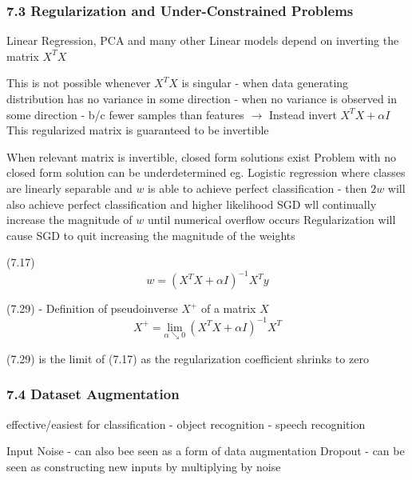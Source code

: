 \documentclass[11pt]{article}
\begin{document}
    \hypertarget{regularization-and-under-constrained-problems}{%
\subsubsection{7.3 Regularization and Under-Constrained
Problems}\label{regularization-and-under-constrained-problems}}

    Linear Regression, PCA and many other Linear models depend on inverting
the matrix \(X^{T}X\)

    This is not possible whenever \(X^{T}X\) is singular - when data
generating distribution has no variance in some direction - when no
variance is observed in some direction - b/c fewer samples than features
\(\rightarrow\) Instead invert \(X^{T}X + \alpha I\) This regularized
matrix is guaranteed to be invertible

    When relevant matrix is invertible, closed form solutions exist Problem
with no closed form solution can be underdetermined eg. Logistic
regression where classes are linearly separable and \(w\) is able to
achieve perfect classification - then \(2w\) will also achieve perfect
classification and higher likelihood SGD wll continually increase the
magnitude of \(w\) until numerical overflow occurs Regularization will
cause SGD to quit increasing the magnitude of the weights

    (7.17) \begin{equation*}
w = (X^{T} X + \alpha I)^{-1} X^{T} y
\end{equation*}

    (7.29) - Definition of pseudoinverse \(X^+\) of a matrix \(X\)
\begin{equation*}
X^+ = \underset{\alpha\searrow0} {\text{lim}}\: (X^{T}X + \alpha I)^{-1} X^{T}
\end{equation*}

    (7.29) is the limit of (7.17) as the regularization coefficient shrinks
to zero

    \hypertarget{dataset-augmentation}{%
\subsubsection{7.4 Dataset Augmentation}\label{dataset-augmentation}}

    effective/easiest for classification - object recognition - speech
recognition

    Input Noise - can also bee seen as a form of data augmentation Dropout -
can be seen as constructing new inputs by multiplying by noise
\end{document}
